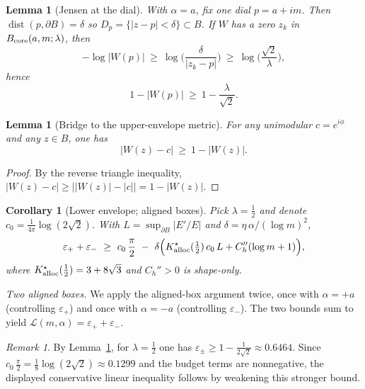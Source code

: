 \documentclass[11pt]{article}
\numberwithin{equation}{section}
\newtheorem{lemma}[theorem]{Lemma}
\newtheorem{corollary}[theorem]{Corollary}
\theoremstyle{remark}
\newtheorem{remark}[theorem]{Remark}
\begin{document}
\begin{lemma}[Jensen at the dial]\label{lem:jensen-dial}
With $\alpha=a$, fix one dial $p=a+im$. Then $\operatorname{dist}(p,\partial B)=\delta$ so $D_p=\{|z-p|<\delta\}\subset B$. If $W$ has a zero $z_k$ in $B_{\rm core}(a,m;\lambda)$, then
\[
-\log|W(p)|\ \ge\ \log\!\Big(\frac{\delta}{|z_k-p|}\Big)\ \ge\ \log\!\Big(\frac{\sqrt{2}}{\lambda}\Big),
\]
hence
\begin{equation}\label{eq:jensen-dial-const} %
1-|W(p)|\ \ge\ 1-\frac{\lambda}{\sqrt{2}}.
\end{equation}
\end{lemma}

\begin{lemma}[Bridge to the upper-envelope metric]\label{lem:bridge-metric}
For any unimodular $c=e^{i\phi}$ and any $z\in B$, one has
\[
|W(z)-c|\ \ge\ 1-|W(z)|.
\]
\end{lemma}
\begin{proof}
By the reverse triangle inequality, $|W(z)-c|\ge \big||W(z)|-|c|\big|=1-|W(z)|$.
\end{proof}

\begin{corollary}[Lower envelope; aligned boxes]\label{cor:lower}
Pick $\lambda=\tfrac12$ and denote $c_0=\frac{1}{4\pi}\log(2\sqrt{2})$. With $L=\sup_{\partial B}|E'/E|$ and $\delta=\eta\,\alpha/(\log m)^2$,
\[
\varepsilon_+ + \varepsilon_- \ \ge\ c_0\,\frac{\pi}{2}\ -\ \delta\Big( K_{\rm alloc}^{\star}(\tfrac12)\,c_0\,L + C_h''(\log m+1) \Big),
\]
where $K_{\rm alloc}^{\star}(\tfrac12)=3+8\sqrt{3}$ and $C_h''>0$ is shape-only.
\end{corollary}

\noindent\emph{Two aligned boxes.} We apply the aligned-box argument twice, once with $\alpha=+a$ (controlling $\varepsilon_+$) and once with $\alpha=-a$ (controlling $\varepsilon_-$). The two bounds sum to yield $\mathcal L(m,\alpha)=\varepsilon_+ + \varepsilon_-$. %
\begin{remark}
By Lemma~\ref{lem:jensen-dial}, for $\lambda=\tfrac12$ one has $\varepsilon_\pm\ge 1-\tfrac{1}{2\sqrt{2}}\approx 0.6464$. Since $c_0\,\tfrac{\pi}{2}=\tfrac18\log(2\sqrt2)\approx 0.1299$ and the budget terms are nonnegative, the displayed conservative linear inequality follows by weakening this stronger bound. %
\end{remark}

\end{document}
